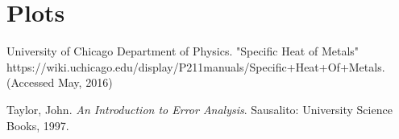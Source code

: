\documentclass{article}
\begin{document}
\section{Plots}
\clearpage

\clearpage
\begin{thebibliography}{10}

		University of Chicago Department of Physics. "Specific Heat of Metals"\\
		https://wiki.uchicago.edu/display/P211manuals/Specific+Heat+Of+Metals. (Accessed May, 2016)

		Taylor, John. \emph{An Introduction to Error Analysis}. Sausalito: University Science Books, 1997.
		
\end{thebibliography}
\end{document}
